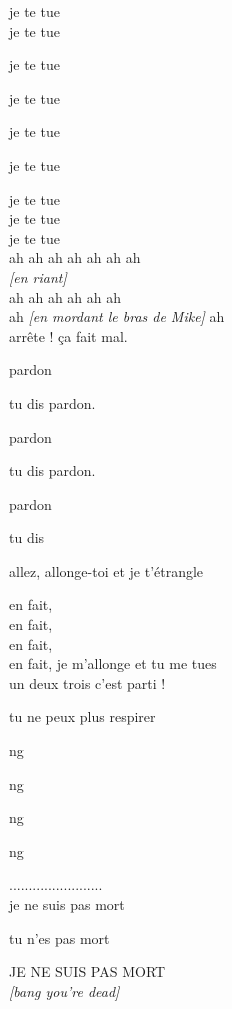 \documentclass{article}
\begin{document}
{ \raggedleft je te tue \\ }
{ \raggedleft je te tue \\ }
{ \raggedright je te tue \\ }
{ \raggedright je te tue \\ }
{ \raggedright je te tue \\ }
{ \raggedright je te tue \\ }
{ \raggedleft je te tue \\ }
{ \raggedleft je te tue \\ }
{ \raggedleft je te tue \\ }
\pagebreak
{ \centering ah ah ah ah ah ah ah \\ }
{ \centering \emph{[en riant]} \\ }
{ \centering ah ah ah ah ah ah \\ }
{ ah \emph{[en mordant le bras de Mike]} \hfill ah \\}
{ \raggedleft arrête ! ça fait mal. \\ }
{ \raggedright pardon \\ }
{ \raggedleft tu dis pardon. \\ }
{ \raggedright pardon \\ }
{ \raggedleft tu dis pardon. \\ }
{ \raggedright pardon \\ }
{ \raggedleft tu dis \\ }
{ \raggedright allez, allonge-toi et je t'étrangle \\ }
{ \raggedleft en fait, \\ }
{ \raggedleft en fait, \\ }
{ \raggedleft en fait, \\ }
{ \raggedleft en fait, je m'allonge et tu me tues \\ }
{ \centering un deux trois c'est parti ! \\ }
{ \raggedright tu ne peux plus respirer \\ }
{ \raggedright ng \\ }
{ \raggedright ng \\ }
{ \raggedright ng \\ }
{ \raggedright ng \\ }
{ \centering ........................ \\ }
{ \raggedleft je ne suis pas mort \\ }
{ \raggedright tu n'es pas mort \\ }
{ \raggedleft JE NE SUIS PAS MORT \\ }
{ \raggedleft \emph{[bang you're dead]} \\ }
\end{document}

